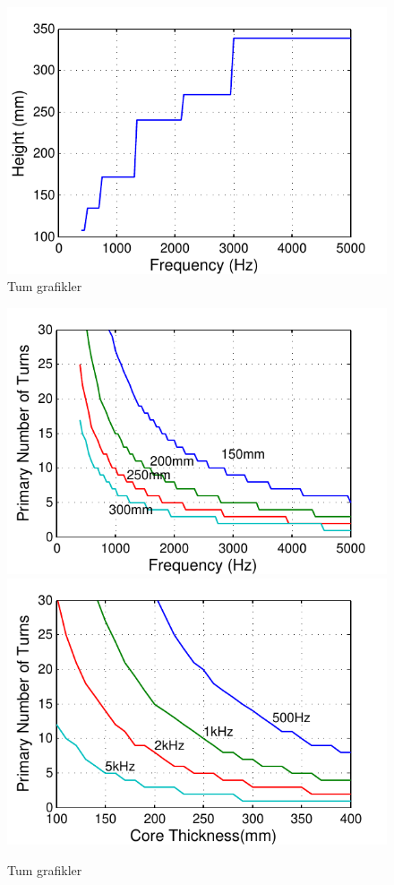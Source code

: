 \documentclass[a4paper, 11pt]{article} %
\begin{document}
\begin{figure}[]
  \centering
    \includegraphics[]{primary_height}
  \caption{Tum grafikler}
  \label{primary_thickness}
\end{figure}

\begin{figure}[]
  \centering
    \includegraphics[]{primary_Nturns_core}
    \includegraphics[]{primary_Nturns_freq}
  \caption{Tum grafikler}
  \label{primary_thickness}
\end{figure}
\end{document}
